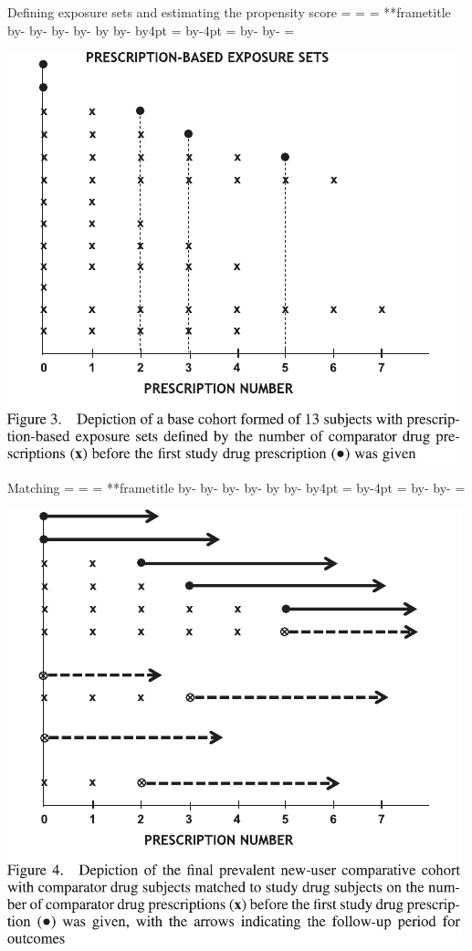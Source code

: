 \documentclass[aspectratio=169,12pt]{beamer} %
\makeatletter
\newif\ifsidebartheme
\newcommand*{\calculatespace}{%
    \contentheight=\paperheight%
    \ifx\beamer@frametitle\@empty%
        \setbox\@tempboxa=\box\voidb@x%
      \else%
        \setbox\@tempboxa=\vbox{%
          \vbox{}%
          {\parskip0pt\usebeamertemplate***{frametitle}}%
        }%
        \ifsidebartheme%
          \advance\contentheight by-1em%
        \fi%
      \fi%
    \advance\contentheight by-\ht\@tempboxa%
    \advance\contentheight by-\dp\@tempboxa%
    \advance\contentheight by-\beamer@frametopskip%
    \ifbeamer@plainframe%
    \contentbottom=0pt%
    \else%
    \advance\contentheight by-\headheight%
    \advance\contentheight by\headdp%
    \advance\contentheight by-\footheight%
    \advance\contentheight by4pt%
    \contentbottom=\footheight%
    \advance\contentbottom by-4pt%
    \fi%
    \contentwidth=\paperwidth%
    \ifbeamer@plainframe%
    \contentleft=0pt%
    \else%
    \advance\contentwidth by-\beamer@rightsidebar%
    \advance\contentwidth by-\beamer@leftsidebar\relax%
    \contentleft=\beamer@leftsidebar%
    \fi%
}
\makeatother
\begin{document}
\begin{frame}{Defining exposure sets and estimating the propensity score}
    \calculatespace%
    \begin{center}
	\includegraphics[height=0.85\contentheight]{ref/suimoodell-fig3.pdf}
    \end{center}

\end{frame}

\begin{frame}{Matching}
    \calculatespace%
    \begin{center}
	\includegraphics[height=0.85\contentheight]{ref/suimoodell-fig4.pdf}
    \end{center}
\end{frame}
\end{document}
